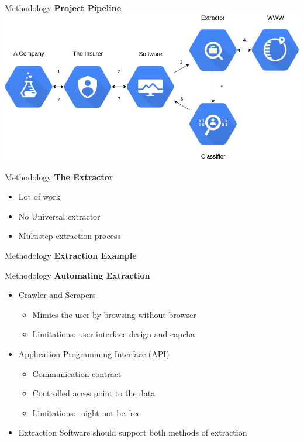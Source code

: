 \begin{frame}[label=metho]{Methodology}
	\textbf{Project Pipeline}
	\includegraphics[width=\textwidth]{images/project_pipeline.png}
\end{frame}


\begin{frame}[label=metho]{Methodology}
	\textbf{The Extractor}
	\begin{itemize}
		\item Lot of work
		\item No Universal extractor
		\item Multistep extraction process
	\end{itemize}
\end{frame}


\begin{frame}[label=metho]{Methodology}
	\textbf{Extraction Example}
	
\end{frame}



\begin{frame}[label=metho]{Methodology}
	\textbf{Automating Extraction}
	\begin{itemize}
		\item Crawler and Scrapers
		\begin{itemize}
			\item Mimics the user by browsing without browser
			\item Limitations: user interface design and capcha
		\end{itemize}		
		\item Application Programming Interface (API)
		\begin{itemize}
			\item Communication contract
			\item Controlled acces point to the data\\
			\item Limitations: might not be free
		\end{itemize}	
		\item Extraction Software should support both methods of extraction
	\end{itemize}	
	
\end{frame}



